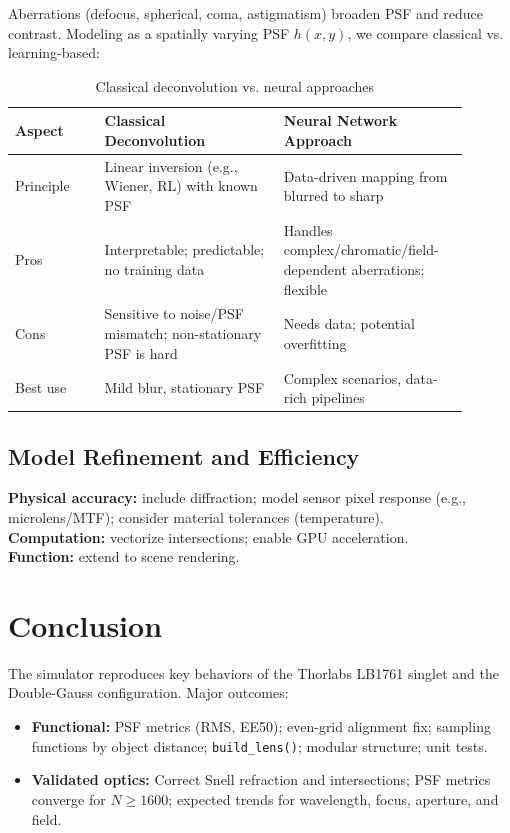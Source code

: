 \documentclass[11pt,a4paper]{article}
\begin{document}
	Aberrations (defocus, spherical, coma, astigmatism) broaden PSF and reduce contrast. Modeling as a spatially varying PSF \(h(x,y)\), we compare classical vs. learning-based:
	\begin{table}[H]
		\centering
		\caption{Classical deconvolution vs. neural approaches}
		\begin{tabular}{p{0.18\linewidth} p{0.36\linewidth} p{0.36\linewidth}}
			\toprule
			\textbf{Aspect} & \textbf{Classical Deconvolution} & \textbf{Neural Network Approach}\\
			\midrule
			Principle & Linear inversion (e.g., Wiener, RL) with known PSF & Data-driven mapping from blurred to sharp \\
			Pros & Interpretable; predictable; no training data & Handles complex/chromatic/field-dependent aberrations; flexible \\
			Cons & Sensitive to noise/PSF mismatch; non-stationary PSF is hard & Needs data; potential overfitting \\
			Best use & Mild blur, stationary PSF & Complex scenarios, data-rich pipelines \\
			\bottomrule
		\end{tabular}
	\end{table}
	
	\subsection{Model Refinement and Efficiency}
	
	\textbf{Physical accuracy:} include diffraction; model sensor pixel response (e.g., microlens/MTF); consider material tolerances (temperature).\\
	\textbf{Computation:} vectorize intersections; enable GPU acceleration.\\
	\textbf{Function:} extend to scene rendering.
	
	\section*{Conclusion}
	
	The simulator reproduces key behaviors of the Thorlabs LB1761 singlet and the Double-Gauss configuration. Major outcomes:
	\begin{itemize}
		\item \textbf{Functional:} PSF metrics (RMS, EE50); even-grid alignment fix; sampling functions by object distance; \texttt{build\_lens()}; modular structure; unit tests.
		\item \textbf{Validated optics:} Correct Snell refraction and intersections; PSF metrics converge for \(N \ge 1600\); expected trends for wavelength, focus, aperture, and field.
	\end{itemize}
	
\end{document}
